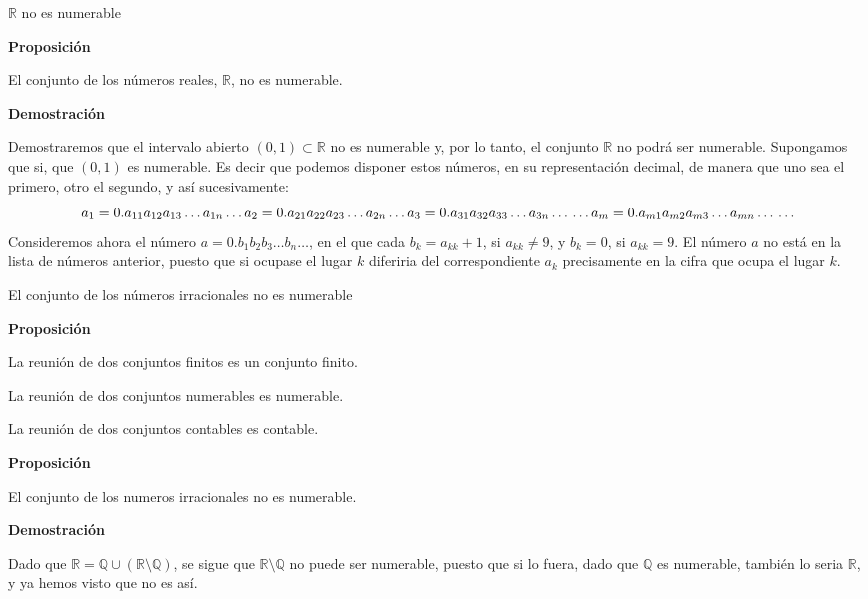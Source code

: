 \documentclass[
  ignorenonframetext,
]{beamer}
\begin{document}
\begin{frame}{\(\mathbb{R}\) no es numerable}
\protect\hypertarget{mathbbr-no-es-numerable}{}

\textbf{Proposición}

El conjunto de los números reales, \(\mathbb{R}\), no es numerable.

\textbf{Demostración}

Demostraremos que el intervalo abierto \((0,1) \subset \mathbb{R}\) no
es numerable y, por lo tanto, el conjunto \(\mathbb{R}\) no podrá ser
numerable. Supongamos que si, que \((0,1)\) es numerable. Es decir que
podemos disponer estos números, en su representación decimal, de manera
que uno sea el primero, otro el segundo, y así sucesivamente: \[
a_1 = 0.a_{11}a_{12}a_{13} \ldots a_{1n} \ldots \\
a_2 = 0.a_{21}a_{22}a_{23} \ldots a_{2n} \ldots \\
a_3 = 0.a_{31}a_{32}a_{33} \ldots a_{3n} \ldots \\
\ldots\\
a_m = 0.a_{m1}a_{m2}a_{m3} \ldots a_{mn} \ldots\\
\ldots
\] Consideremos ahora el número \(a=0.b_1b_2b_3 \ldots b_n \ldots\), en
el que cada \(b_k=a_{kk}+1\), si \(a_{kk} \neq 9\), y \(b_k = 0\), si
\(a_{kk} = 9\). El número \(a\) no está en la lista de números anterior,
puesto que si ocupase el lugar \(k\) diferiria del correspondiente
\(a_k\) precisamente en la cifra que ocupa el lugar \(k\).

\end{frame}

\begin{frame}{El conjunto de los números irracionales no es numerable}
\protect\hypertarget{el-conjunto-de-los-nuxfameros-irracionales-no-es-numerable}{}

\textbf{Proposición}

La reunión de dos conjuntos finitos es un conjunto finito.

La reunión de dos conjuntos numerables es numerable.

La reunión de dos conjuntos contables es contable.

\textbf{Proposición}

El conjunto de los numeros irracionales no es numerable.

\textbf{Demostración}

Dado que
\(\mathbb{R} = \mathbb{Q} \cup (\mathbb{R} \setminus \mathbb{Q})\), se
sigue que \(\mathbb{R} \setminus \mathbb{Q}\) no puede ser numerable,
puesto que si lo fuera, dado que \(\mathbb{Q}\) es numerable, también lo
seria \(\mathbb{R}\), y ya hemos visto que no es así.

\end{frame}
\end{document}
